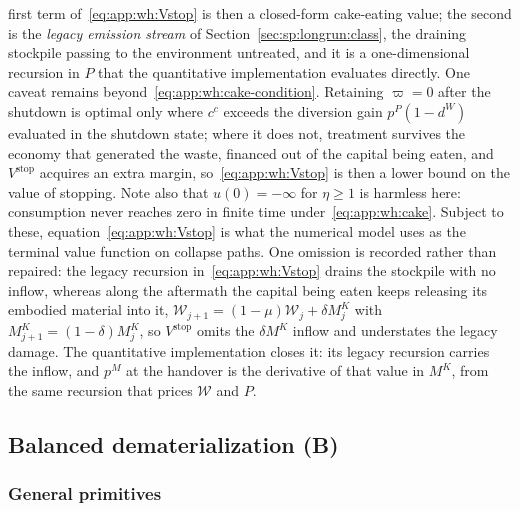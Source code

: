 first term of~\eqref{eq:app:wh:Vstop} is then a closed-form cake-eating value; the second is the \emph{legacy emission stream} of Section~\ref{sec:sp:longrun:class}, the draining stockpile passing to the environment untreated, and it is a one-dimensional recursion in $P$ that the quantitative implementation evaluates directly. One caveat remains beyond~\eqref{eq:app:wh:cake-condition}. Retaining $\varpi=0$ after the shutdown is optimal only where $c^c$ exceeds the diversion gain $p^P\left(1-d^W\right)$ evaluated in the shutdown state; where it does not, treatment survives the economy that generated the waste, financed out of the capital being eaten, and $V^{\mathrm{stop}}$ acquires an extra margin, so~\eqref{eq:app:wh:Vstop} is then a lower bound on the value of stopping. Note also that $u\left(0\right)=-\infty$ for $\eta\ge1$ is harmless here: consumption never reaches zero in finite time under~\eqref{eq:app:wh:cake}. Subject to these, equation~\eqref{eq:app:wh:Vstop} is what the numerical model uses as the terminal value function on collapse paths. One omission is recorded rather than repaired: the legacy recursion in~\eqref{eq:app:wh:Vstop} drains the stockpile with no inflow, whereas along the aftermath the capital being eaten keeps releasing its embodied material into it, $\mathcal W_{j+1}=\left(1-\mu\right)\mathcal W_j+\delta M^K_j$ with $M^K_{j+1}=\left(1-\delta\right)M^K_j$, so $V^{\mathrm{stop}}$ omits the $\delta M^K$ inflow and understates the legacy damage. The quantitative implementation closes it: its legacy recursion carries the inflow, and $p^M$ at the handover is the derivative of that value in $M^K$, from the same recursion that prices $\mathcal W$ and $P$.

\subsection{Balanced dematerialization (B)}\label{sec:app:proofs:bdp}

\subsubsection{General primitives}\label{sec:app:proofs:bdp:general}

